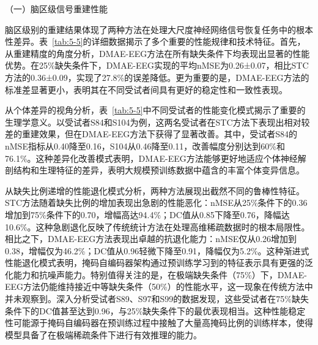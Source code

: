 （一）脑区级信号重建性能

脑区级别的重建结果体现了两种方法在处理大尺度神经网络信号恢复任务中的根本性差异。表~\ref{tab:5-5}的详细数据揭示了多个重要的性能规律和技术特征。首先，从重建精度的角度分析，DMAE-EEG方法在所有缺失条件下均表现出显著的性能优势。在25\%缺失条件下，DMAE-EEG实现的平均nMSE为0.26±0.07，相比STC方法的0.36±0.09，实现了27.8\%的误差降低。更为重要的是，DMAE-EEG方法的标准差显著更小，表明其在不同受试者间具有更好的稳定性和一致性表现。

从个体差异的视角分析，表~\ref{tab:5-5}中不同受试者的性能变化模式揭示了重要的生理学意义。以受试者S84和S104为例，这两名受试者在STC方法下表现出相对较差的重建效果，但在DMAE-EEG方法下获得了显著改善。其中，受试者S84的nMSE指标从0.40降至0.16，S104从0.46降至0.11，改善幅度分别达到60\%和76.1\%。这种差异化改善模式表明，DMAE-EEG方法能够更好地适应个体神经解剖结构和生理特征的差异，表明大规模预训练数据中蕴含的丰富个体变异信息。

从缺失比例递增的性能退化模式分析，两种方法展现出截然不同的鲁棒性特征。STC方法随着缺失比例的增加表现出急剧的性能恶化：nMSE从25\%条件下的0.36增加到75\%条件下的0.70，增幅高达94.4\%；DC值从0.85下降至0.76，降幅达10.6\%。这种急剧退化反映了传统统计方法在处理高维稀疏数据时的根本局限性。相比之下，DMAE-EEG方法表现出卓越的抗退化能力：nMSE仅从0.26增加到0.38，增幅仅为46.2\%；DC值从0.96轻微下降至0.91，降幅仅为5.2\%。这种渐进式性能退化模式表明，掩码自编码器架构通过预训练学习到的特征表示具有更强的泛化能力和抗噪声能力。特别值得关注的是，在极端缺失条件（75\%）下，DMAE-EEG方法仍能维持接近中等缺失条件（50\%）的性能水平，这一现象在传统方法中并未观察到。深入分析受试者S89、S97和S99的数据发现，这些受试者在75\%缺失条件下的DC值甚至达到0.96，与25\%缺失条件下的最优表现相当。这种性能稳定性可能源于掩码自编码器在预训练过程中接触了大量高掩码比例的训练样本，使得模型具备了在极端稀疏条件下进行有效推理的能力。

